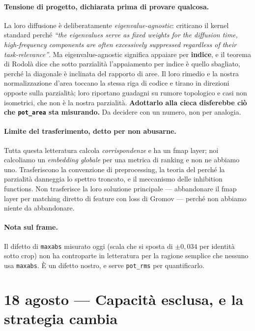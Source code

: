 \documentclass[11pt,a4paper]{article}
\begin{document}
\paragraph{Tensione di progetto, dichiarata prima di provare qualcosa.} La loro diffusione \`e
deliberatamente \emph{eigenvalue-agnostic}: criticano il kernel standard perch\'e \emph{``the
eigenvalues serve as fixed weights for the diffusion time, high-frequency components are often
excessively suppressed regardless of their task-relevance''}. Ma eigenvalue-agnostic significa
appaiare per \textbf{indice}, e il teorema di Rodol\`a dice che sotto parzialit\`a l'appaiamento
per indice \`e quello sbagliato, perch\'e la diagonale \`e inclinata del rapporto di aree. Il loro
rimedio e la nostra normalizzazione d'area toccano la stessa riga di codice e tirano in direzioni
opposte sulla parzialit\`a; loro riportano guadagni su rumore topologico e casi non isometrici,
che non \`e la nostra parzialit\`a. \textbf{Adottarlo alla cieca disferebbe ci\`o che
\texttt{pot\_area} sta misurando.} Da decidere con un numero, non per analogia.

\paragraph{Limite del trasferimento, detto per non abusarne.} Tutta questa letteratura calcola
\emph{corrispondenze} e ha un fmap layer; noi calcoliamo un \emph{embedding globale} per una
metrica di ranking e non ne abbiamo uno. Trasferiscono la convenzione di preprocessing, la teoria
del perch\'e la parzialit\`a danneggia lo spettro troncato, e il meccanismo delle inhibition
functions. Non trasferisce la loro soluzione principale --- abbandonare il fmap layer per
matching diretto di feature con loss di Gromov --- perch\'e non abbiamo niente da abbandonare.

\paragraph{Nota sul frame.} Il difetto di \texttt{maxabs} misurato oggi (scala che si sposta di
$\pm 0{,}034$ per identit\`a sotto crop) non ha controparte in letteratura per la ragione
semplice che nessuno usa \texttt{maxabs}. \`E un difetto nostro, e serve \texttt{pot\_rms} per
quantificarlo.


\section{18 agosto --- Capacit\`a esclusa, e la strategia cambia}
\end{document}
